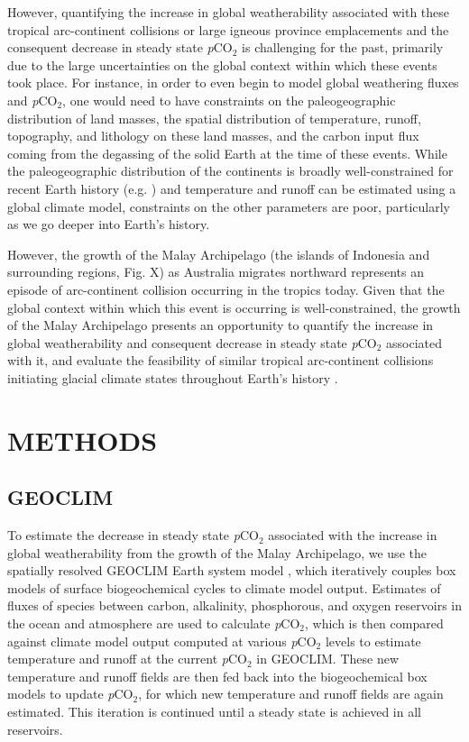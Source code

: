 \documentclass[11pt,letterpaper]{article}
\newcommand{\pCOtwo}{\textit{p}CO$_{2}$\xspace}
\begin{document}
However, quantifying the increase in global weatherability associated with these tropical arc-continent collisions or large igneous province emplacements and the consequent decrease in steady state \pCOtwo is challenging for the past, primarily due to the large uncertainties on the global context within which these events took place. For instance, in order to even begin to model global weathering fluxes and \pCOtwo, one would need to have constraints on the paleogeographic distribution of land masses, the spatial distribution of temperature, runoff, topography, and lithology on these land masses, and the carbon input flux coming from the degassing of the solid Earth at the time of these events. While the paleogeographic distribution of the continents is broadly well-constrained for recent Earth history (e.g. \citealp{Torsvik2016a}) and temperature and runoff can be estimated using a global climate model, constraints on the other parameters are poor, particularly as we go deeper into Earth's history.

However, the growth of the Malay Archipelago (the islands of Indonesia and surrounding regions, Fig. X) as Australia migrates northward represents an episode of arc-continent collision occurring in the tropics today. Given that the global context within which this event is occurring is well-constrained, the growth of the Malay Archipelago presents an opportunity to quantify the increase in global weatherability and consequent decrease in steady state \pCOtwo associated with it, and evaluate the feasibility of similar tropical arc-continent collisions initiating glacial climate states throughout Earth's history \citep{Macdonald2019a}.

\section*{METHODS}

\subsection*{GEOCLIM}

To estimate the decrease in steady state \pCOtwo associated with the increase in global weatherability from the growth of the Malay Archipelago, we use the spatially resolved GEOCLIM Earth system model \citep{Godderis2014a, Godderis2017c}, which iteratively couples box models of surface biogeochemical cycles to climate model output. Estimates of fluxes of species between carbon, alkalinity, phosphorous, and oxygen reservoirs in the ocean and atmosphere are used to calculate \pCOtwo, which is then compared against climate model output computed at various \pCOtwo levels to estimate temperature and runoff at the current \pCOtwo in GEOCLIM. These new temperature and runoff fields are then fed back into the biogeochemical box models to update \pCOtwo, for which new temperature and runoff fields are again estimated. This iteration is continued until a steady state is achieved in all reservoirs.
\end{document}
